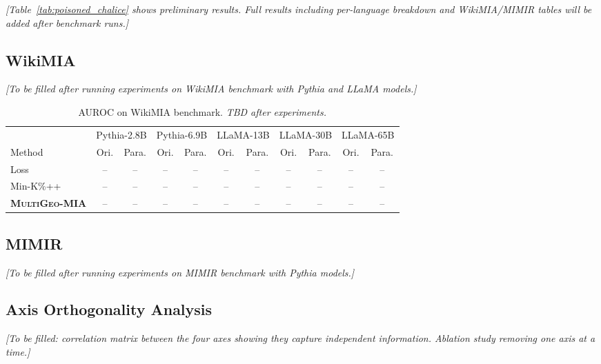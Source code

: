 \documentclass[11pt]{article}
\newcommand{\ours}{\textsc{MultiGeo-MIA}}
\begin{document}
\textit{[Table~\ref{tab:poisoned_chalice} shows preliminary results. Full results including per-language breakdown and WikiMIA/MIMIR tables will be added after benchmark runs.]}

\subsection{WikiMIA}

\textit{[To be filled after running experiments on WikiMIA benchmark with Pythia and LLaMA models.]}

\begin{table}[t]
\centering
\small
\begin{tabular}{@{}l*{5}{cc}@{}}
\toprule
& \multicolumn{2}{c}{Pythia-2.8B} & \multicolumn{2}{c}{Pythia-6.9B} & \multicolumn{2}{c}{LLaMA-13B} & \multicolumn{2}{c}{LLaMA-30B} & \multicolumn{2}{c}{LLaMA-65B} \\
\cmidrule(lr){2-3} \cmidrule(lr){4-5} \cmidrule(lr){6-7} \cmidrule(lr){8-9} \cmidrule(lr){10-11}
Method & Ori. & Para. & Ori. & Para. & Ori. & Para. & Ori. & Para. & Ori. & Para. \\
\midrule
Loss & -- & -- & -- & -- & -- & --  & -- & -- & -- & -- \\
Min-K\%++ & -- & -- & -- & -- & -- & -- & -- & -- & -- & -- \\
\textbf{\ours{}} & -- & -- & -- & -- & -- & -- & -- & -- & -- & -- \\
\bottomrule
\end{tabular}
\caption{AUROC on WikiMIA benchmark. \textit{TBD after experiments.}}
\label{tab:wikimia}
\end{table}

\subsection{MIMIR}

\textit{[To be filled after running experiments on MIMIR benchmark with Pythia models.]}

\subsection{Axis Orthogonality Analysis}

\textit{[To be filled: correlation matrix between the four axes showing they capture independent information. Ablation study removing one axis at a time.]}

\end{document}
